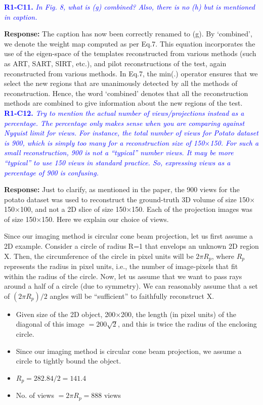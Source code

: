 \documentclass{article}
\begin{document}
\textcolor{blue}{\textbf{R1-C11.}\textit{ In Fig. 8, what is (g) combined? Also, there is no (h) but is mentioned in caption.}}

\textbf{Response:} The caption has now been correctly renamed to (g). 
By `combined', we denote the weight map computed as per Eq.7.  This equation incorporates the use of the eigen-space of the templates reconstructed from various methods (such as ART, SART, SIRT, etc.), and pilot reconstructions of the test,  again reconstructed from various methods. In Eq.7, the min(.) operator ensures that we select the new regions that are unanimously detected by all the methods of reconstruction. Hence, the word `combined' denotes that all the reconstruction methods are combined to give information about the new regions of the test.\\

\textcolor{blue}{\textbf{R1-C12.}\textit{ Try to mention the actual number of views/projections instead as a percentage. The percentage only makes sense when you are comparing against Nyquist limit for views. For instance, the total number of views for Potato dataset is 900, which is simply too many for a reconstruction size of 150$\times$150. For such a small reconstruction, 900 is not a ``typical'' number views. It may be more ``typical'' to use 150 views in standard practice. So, expressing views as a percentage of 900 is confusing.}}
  
  \textbf{Response:} Just to clarify, as mentioned in the paper, the 900 views for the potato dataset was used to reconstruct the ground-truth 3D volume of size 150$\times$150$\times$100, and not a 2D slice of size 150$\times$150.  Each of the projection images was of size 150$\times$150. Here we explain our choice of views.
  
Since our imaging method is circular cone beam projection, let us first assume a 2D example. Consider a circle of radius R=1 that envelops an unknown 2D region X. Then, the circumference of the circle in pixel units will be $2\pi R_p$, where $R_p$ represents the radius in pixel units, i.e., the number of image-pixels that fit within the radius of the circle. Now, let us assume that we want to pass rays around a half of a circle (due to symmetry). We can reasonably assume that a set of $(2\pi R_p)/2$ angles will be ``sufficient'' to faithfully reconstruct X.
\begin{itemize}
\item Given size of the 2D object, 200$\times$200, the length (in pixel units) of the diagonal of this image $= 200\sqrt 2$, and this is twice the radius of the enclosing circle.
\item Since our imaging method is circular cone beam projection, we assume a circle to tightly bound the object.
\item $R_p = 282.84/2 = 141.4$
\item No. of views $= 2\pi R_p = 888$ views
\end{itemize}
\end{document}
